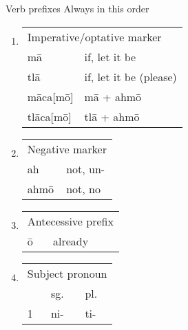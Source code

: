\documentclass[12pt]{beamer}
\newcommand{\nah}[1]{\textcolor{nahgrn}{#1}}
\newcommand{\trs}[1]{\textcolor{nahblu}{#1}}
\begin{document}
\begin{frame}%
  \begin{columns}[t]
    \begin{column}{0.18\linewidth}
      \begin{block}{Verb prefixes}
        Always in this order
        \begin{enumerate}
          \item
                \begin{tabular}[t]{ll}
                  \multicolumn{2}{l}{Imperative/optative marker} \\
                  \nah{mā}        & \trs{if, let it be}          \\
                  \nah{tlā}       & \trs{if, let it be (please)} \\
                  \nah{māca[mō]}  & \nah{mā + ahmō}              \\
                  \nah{tlāca[mō]} & \nah{tlā + ahmō}             \\
                \end{tabular}
          \item
                \begin{tabular}[t]{ll}
                  \multicolumn{2}{l}{Negative marker} \\
                  \nah{ah}   & \trs{not, un-}         \\
                  \nah{ahmō} & \trs{not, no}          \\
                \end{tabular}
          \item
                \begin{tabular}[t]{ll}
                  \multicolumn{2}{l}{Antecessive prefix} \\
                  \nah{ō} & \trs{already}                \\
                \end{tabular}
          \item
                \begin{threeparttable}
                  \begin{tabular}[t]{lll}
                    \multicolumn{3}{l}{Subject pronoun}             \\
                      & sg.                & pl.                    \\
                    1 & \nah{ni-}          & \nah{ti-}              \\

\end{tabular}
\end{threeparttable}
\end{enumerate}
\end{block}
\end{column}
\end{columns}
\end{frame}
\end{document}
